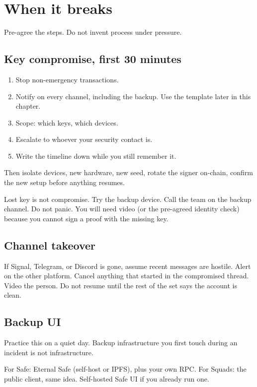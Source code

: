 \chapter{When it breaks}

Pre-agree the steps. Do not invent process under
pressure.

\section{Key compromise, first 30 minutes}

\begin{enumerate}
  \item Stop non-emergency transactions.
  \item Notify on every channel, including the
  backup. Use the template later in this chapter.
  \item Scope: which keys, which devices.
  \item Escalate to whoever your security contact
  is.
  \item Write the timeline down while you still
  remember it.
\end{enumerate}

Then isolate devices, new hardware, new seed,
rotate the signer on-chain, confirm the new setup
before anything resumes.

Lost key is not compromise. Try the backup device.
Call the team on the backup channel. Do not panic.
You will need video (or the pre-agreed identity
check) because you cannot sign a proof with the
missing key.

\section{Channel takeover}

If Signal, Telegram, or Discord is gone, assume
recent messages are hostile. Alert on the other
platform. Cancel anything that started in the
compromised thread. Video the person. Do not
resume until the rest of the set says the account
is clean.

\section{Backup UI}

Practice this on a quiet day. Backup
infrastructure you first touch during an incident
is not infrastructure.

For Safe: Eternal Safe (self-host or IPFS), plus
your own RPC. For Squads: the public client, same
idea. Self-hosted Safe UI if you already run one.

